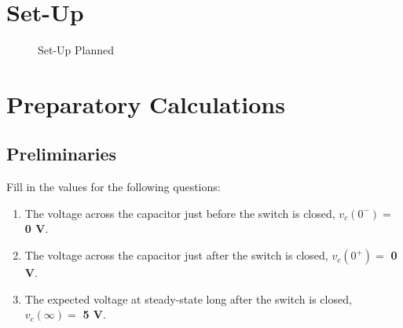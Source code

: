 \documentclass[a4paper,12pt,oneside, tikz]{book}
\begin{document}
\section{Set-Up}

\begin{figure}[htbp]
    \centering
    \label{fig:breadboard2}
    
    \caption{Set-Up Planned} \label{fig:2}
\end{figure}

\section{Preparatory Calculations}
\subsection{Preliminaries}
\begin{tcolorbox}
    Fill in the values for the following questions:
    \begin{enumerate}
        \item The voltage across the capacitor just before the switch is closed, $v_c(0^-) = $\textbf{ 0 V}.
        \item The voltage across the capacitor just after the switch is closed, $v_c(0^+) = $\textbf{ 0 V}.
        \item The expected voltage at steady-state long after the switch is closed, $v_c(\infty) = $\textbf{ 5 V}.
    \end{enumerate}
    
\end{tcolorbox}
\end{document}
